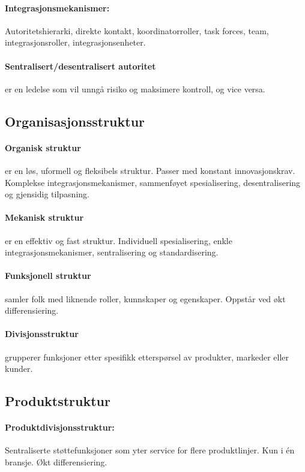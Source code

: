 \documentclass[a4paper]{article}
\begin{document}
\paragraph{Integrasjonsmekanismer:} Autoritetshierarki, direkte kontakt, koordinatorroller, task forces, team, integrasjonsroller, integrasjonsenheter.
\paragraph{Sentralisert/desentralisert autoritet} er en ledelse som vil unngå risiko og maksimere kontroll, og vice versa.

\subsection{Organisasjonsstruktur}
\paragraph{Organisk struktur} er en løs, uformell og fleksibels struktur. Passer med konstant innovasjonskrav. Komplekse integrasjonsmekanismer, sammenføyet spesialisering, desentralisering og gjensidig tilpasning.
\paragraph{Mekanisk struktur} er en effektiv og fast struktur. Individuell spesialisering, enkle integrasjonsmekanismer, sentralisering og standardisering.
\paragraph{Funksjonell struktur} samler folk med liknende roller, kunnskaper og egenskaper. Oppstår ved økt differensiering.
\paragraph{Divisjonsstruktur} grupperer funksjoner etter spesifikk etterspørsel av produkter, markeder eller kunder.

\subsection{Produktstruktur}
\paragraph{Produktdivisjonsstruktur:} Sentraliserte støttefunksjoner som yter service for flere produktlinjer. Kun i én bransje. Økt differensiering.
\end{document}
